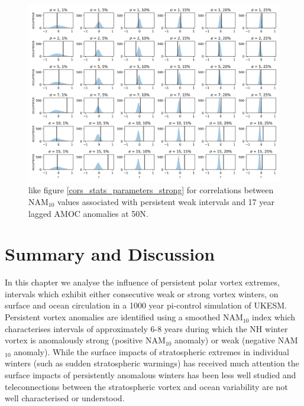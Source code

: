 \newpage
\begin{landscape}
\begin{figure}[h!]
\begin{center}
\noindent\includegraphics[width =0.9\linewidth]{Figures/Figures-surface/cors_sigs_thresh_and_sigma_weak.png} 
\caption{like figure \ref{cors_stats_parameters_strong} for correlations between NAM$_{10}$ values associated with persistent weak intervals and 17 year lagged AMOC anomalies at 50N.}
\label{cors_stats_parameters_weak}
\end{center}
\end{figure}
\end{landscape}


\section{Summary and Discussion}

In this chapter we analyse the influence of persistent polar vortex extremes, intervals which exhibit either consecutive weak or strong vortex winters, on surface and ocean circulation in a 1000 year pi-control simulation of UKESM. Persistent vortex anomalies are identified using a smoothed NAM$_{10}$ index which characterises intervals of approximately 6-8 years during which the NH winter vortex is anomalously strong (positive NAM$_{10}$ anomaly) or weak (negative NAM$_{10}$ anomaly). While the surface impacts of stratospheric extremes in individual winters (such as sudden stratospheric warmings) has received much attention \citep{baldwinStratospheric2001a, domeisenEstimating2019, charlton-perezInfluence2018a} the surface impacts of persistently anomalous winters has been less well studied and  teleconnections between the stratospheric vortex and ocean variability are not well characterised or understood. 

